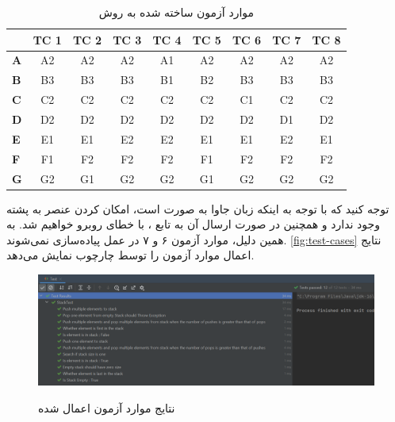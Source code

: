 \documentclass[twoside]{article}
\newenvironment{answer}{}{\medskip}
\begin{document}
\begin{answer}
	\begin{table}[h]
		\centering
		\caption{موارد آزمون ساخته شده به روش }
		\label{tbl:ec-test-cases}
		\begin{latin}
		\begin{tabular}{l|c|c|c|c|c|c|c|c|}
			\cline{2-9}
			& \textbf{TC 1} & \textbf{TC 2} & \textbf{TC 3} & \textbf{TC 4} & \textbf{TC 5} & \textbf{TC 6} & \textbf{TC 7} & \textbf{TC 8} \\ \hline
			\multicolumn{1}{|l|}{\textbf{A}} & A2         & A2         & A2         & A1         & A2         & A2         & A2         & A2         \\ \hline
			\multicolumn{1}{|l|}{\textbf{B}} & B3         & B3         & B3         & B1         & B2         & B3         & B3         & B3         \\ \hline
			\multicolumn{1}{|l|}{\textbf{C}} & C2         & C2         & C2         & C2         & C2         & C1         & C2         & C2         \\ \hline
			\multicolumn{1}{|l|}{\textbf{D}} & D2         & D2         & D2         & D2         & D2         & D2         & D1         & D2         \\ \hline
			\multicolumn{1}{|l|}{\textbf{E}} & E1         & E1         & E2         & E2         & E1         & E1         & E2         & E1         \\ \hline
			\multicolumn{1}{|l|}{\textbf{F}} & F1         & F2         & F2         & F2         & F1         & F2         & F2         & F2         \\ \hline
			\multicolumn{1}{|l|}{\textbf{G}} & G2         & G1         & G2         & G2         & G1         & G2         & G2         & G2         \\ \hline
		\end{tabular}
	\end{latin}
	\end{table}

توجه کنید که با توجه به اینکه زبان جاوا به صورت  است، امکان  کردن عنصر  به پشته وجود ندارد و همچنین در صورت ارسال آن به تابع ، با خطای  روبرو خواهیم شد. به همین دلیل، موارد آزمون ۶ و ۷ در عمل پیاده‌سازی نمی‌شوند. \autoref{fig:test-cases} نتایج اعمال موارد آزمون را توسط چارچوب  نمایش می‌دهد.

\begin{figure}
	\caption{نتایج موارد آزمون اعمال شده}
	\includegraphics[width=\textwidth]{test-status-q3}
	\label{fig:test-cases}
\end{figure}
\end{answer}
\end{document}
